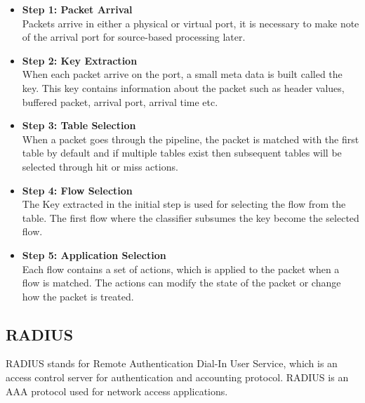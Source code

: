 \begin{itemize}
	\item \textbf{Step 1: Packet Arrival}
	\\ Packets arrive in either a physical or virtual port, it is necessary to make note of the arrival port for source-based processing later.
	\item \textbf{Step 2: Key Extraction}
	\\ When each packet arrive on the port, a small meta data is built called the key. This key contains information about the packet such as header values, buffered packet, arrival port, arrival time etc. 

	\item \textbf{Step 3: Table Selection}
	\\ When a packet goes through the pipeline, the packet is matched with the first table by default and if multiple tables exist then subsequent tables will be selected through hit or miss actions.
	\item \textbf{Step 4: Flow Selection}
	\\ The Key extracted in the initial step is used for selecting the flow from the table. The first flow where the classifier subsumes the key become the selected flow.
	\item \textbf{Step 5: Application Selection}
	\\ Each flow contains a set of actions, which is applied to the packet when a flow is matched. The actions can modify the state of the packet or change how the packet is treated. 
	
\end{itemize}

\subsection{RADIUS \cite{RADIUS_RFC2865}} \label{RADIUS}
RADIUS stands for Remote Authentication Dial-In User Service, which is an access control server for authentication and accounting protocol. RADIUS is an AAA protocol used for network access applications.
